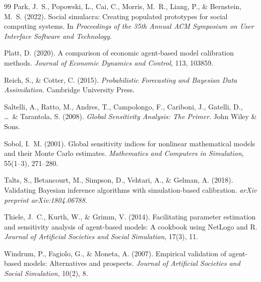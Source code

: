 \documentclass[12pt]{article}
\begin{document}
\begin{thebibliography}{99}
Park, J.~S., Popowski, L., Cai, C., Morris, M.~R., Liang, P., \& Bernstein, M.~S. (2022).
\newblock Social simulacra: Creating populated prototypes for social computing systems.
\newblock In \textit{Proceedings of the 35th Annual ACM Symposium on User Interface Software and Technology}.

Platt, D. (2020).
\newblock A comparison of economic agent-based model calibration methods.
\newblock \textit{Journal of Economic Dynamics and Control}, 113, 103859.

Reich, S., \& Cotter, C. (2015).
\newblock \textit{Probabilistic Forecasting and Bayesian Data Assimilation}.
\newblock Cambridge University Press.

Saltelli, A., Ratto, M., Andres, T., Campolongo, F., Cariboni, J., Gatelli, D., \ldots\ \& Tarantola, S. (2008).
\newblock \textit{Global Sensitivity Analysis: The Primer}.
\newblock John Wiley \& Sons.

Sobol, I.~M. (2001).
\newblock Global sensitivity indices for nonlinear mathematical models and their Monte Carlo estimates.
\newblock \textit{Mathematics and Computers in Simulation}, 55(1--3), 271--280.

Talts, S., Betancourt, M., Simpson, D., Vehtari, A., \& Gelman, A. (2018).
\newblock Validating Bayesian inference algorithms with simulation-based calibration.
\newblock \textit{arXiv preprint arXiv:1804.06788}.

Thiele, J.~C., Kurth, W., \& Grimm, V. (2014).
\newblock Facilitating parameter estimation and sensitivity analysis of agent-based models: A cookbook using NetLogo and R.
\newblock \textit{Journal of Artificial Societies and Social Simulation}, 17(3), 11.

Windrum, P., Fagiolo, G., \& Moneta, A. (2007).
\newblock Empirical validation of agent-based models: Alternatives and prospects.
\newblock \textit{Journal of Artificial Societies and Social Simulation}, 10(2), 8.

\end{thebibliography}
\end{document}
